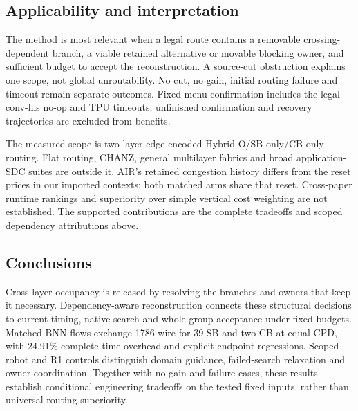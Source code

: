 \documentclass[conference,10pt]{IEEEtran}
\begin{document}
\subsection{Applicability and interpretation}
The method is most relevant when a legal route contains a removable crossing-dependent branch, a viable retained alternative or movable blocking owner, and sufficient budget to accept the reconstruction. A source-cut obstruction explains one scope, not global unroutability. No cut, no gain, initial routing failure and timeout remain separate outcomes. Fixed-menu confirmation includes the legal conv-hls no-op and TPU timeouts; unfinished confirmation and recovery trajectories are excluded from benefits.

The measured scope is two-layer edge-encoded Hybrid-O/SB-only/CB-only routing. Flat routing, CHANZ, general multilayer fabrics and broad application-SDC suites are outside it. AIR's retained congestion history differs from the reset prices in our imported contexts; both matched arms share that reset. Cross-paper runtime rankings and superiority over simple vertical cost weighting are not established. The supported contributions are the complete tradeoffs and scoped dependency attributions above.

\subsection{Conclusions}
Cross-layer occupancy is released by resolving the branches and owners that keep it necessary. Dependency-aware reconstruction connects these structural decisions to current timing, native search and whole-group acceptance under fixed budgets. Matched BNN flows exchange 1786 wire for 39 SB and two CB at equal CPD, with 24.91\% complete-time overhead and explicit endpoint regressions. Scoped robot and R1 controls distinguish domain guidance, failed-search relaxation and owner coordination. Together with no-gain and failure cases, these results establish conditional engineering tradeoffs on the tested fixed inputs, rather than universal routing superiority.


\end{document}
